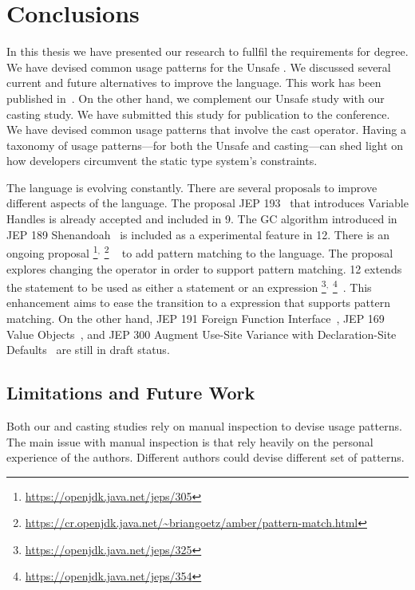 \chapter{Conclusions}\label{cha:conclusions}

In this thesis we have presented our research to fullfil the requirements for \phd{} degree.
We have devised common usage patterns for the \java{} Unsafe \api{}.
We discussed several current and future alternatives to improve the
\java{} language.
This work has been published in~\citep{mastrangeloUseYourOwn2015}.
On the other hand, we complement our Unsafe \api{} study with 
our casting study.
We have submitted this study for publication to the  conference.
We have devised common usage patterns that involve the cast operator.
Having a taxonomy of usage patterns---for both the Unsafe \api{} and casting---can shed light on how \java{} developers circumvent the static type system's constraints.

The \java{} language is evolving constantly.
There are several proposals to improve different aspects of the language.
The proposal JEP 193~\citep{jep193} that introduces Variable Handles is already accepted and included in \java{} 9.
The GC algorithm introduced in JEP 189 Shenandoah~\citep{jep189} is included as a experimental feature in \java{} 12.
There is an ongoing proposal%
\footnote{\url{https://openjdk.java.net/jeps/305}}$^{,}$%
\footnote{\url{https://cr.openjdk.java.net/~briangoetz/amber/pattern-match.html}}%
~\citep{jep305} to add pattern matching to the \java{} language.
The proposal explores changing the  operator in order to support pattern matching.
\java{} 12 extends the  statement to be used as either a statement or an expression%
\footnote{\url{https://openjdk.java.net/jeps/325}}$^{,}$%
\footnote{\url{https://openjdk.java.net/jeps/354}}~\citep{jep325,jep354}.
This enhancement aims to ease the transition to a  expression that supports pattern matching.
On the other hand,
JEP 191 Foreign Function Interface~\citep{jep191},
JEP 169 Value Objects~\citep{jep169}, and
JEP 300 Augment Use-Site Variance with Declaration-Site Defaults~\citep{jep300}
are still in draft status.

\section*{Limitations and Future Work}

Both our \unsafe{} and casting studies rely on manual inspection to devise usage patterns.
The main issue with manual inspection is that rely heavily on the personal experience of the authors.
Different authors could devise different set of patterns.

